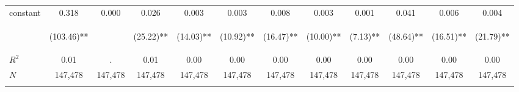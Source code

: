 \begin{tabular}{lccccccccccc}
\noalign{\smallskip}constant & 0.318 & 0.000 & 0.026 & 0.003 & 0.003 & 0.008 & 0.003 & 0.001 & 0.041 & 0.006 & 0.004\\
 & \begin{footnotesize}(103.46)**\end{footnotesize} & \begin{footnotesize}\end{footnotesize} & \begin{footnotesize}(25.22)**\end{footnotesize} & \begin{footnotesize}(14.03)**\end{footnotesize} & \begin{footnotesize}(10.92)**\end{footnotesize} & \begin{footnotesize}(16.47)**\end{footnotesize} & \begin{footnotesize}(10.00)**\end{footnotesize} & \begin{footnotesize}(7.13)**\end{footnotesize} & \begin{footnotesize}(48.64)**\end{footnotesize} & \begin{footnotesize}(16.51)**\end{footnotesize} & \begin{footnotesize}(21.79)**\end{footnotesize}\\
\noalign{\smallskip}$R^2$ & 0.01 & . & 0.01 & 0.00 & 0.00 & 0.00 & 0.00 & 0.00 & 0.00 & 0.00 & 0.00\\
$N$ & 147,478 & 147,478 & 147,478 & 147,478 & 147,478 & 147,478 & 147,478 & 147,478 & 147,478 & 147,478 & 147,478\\
\noalign{\smallskip}\hline\hline\end{tabular}
